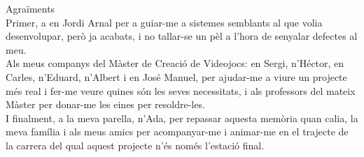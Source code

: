 \newpage

{\LARGE Agraïments}
\\

Primer, a en Jordi Arnal per a guiar-me a sistemes semblants al que volia desenvolupar, però ja acabats, i no tallar-se un pèl a l'hora de senyalar defectes al meu.
\\

Als meus companys del Màster de Creació de Videojocs: en Sergi, n'Héctor, en Carles, n'Eduard, n'Albert i en José Manuel, per ajudar-me a viure un projecte més real i fer-me veure quines són les seves necessitats, i als professors del mateix Màster per donar-me les eines per resoldre-les.
\\

I finalment, a la meva parella, n'Ada, per repassar aquesta memòria quan calia, la meva família i als meus amics per acompanyar-me i animar-me en el trajecte de la carrera del qual aquest projecte n'és només l'estació final.